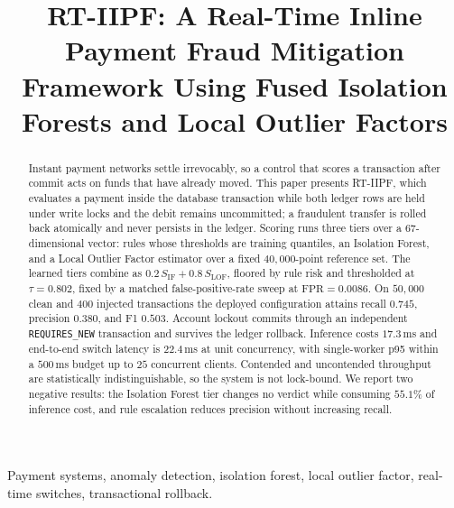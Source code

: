 \documentclass[conference]{IEEEtran}
\begin{document}
\title{RT-IIPF: A Real-Time Inline Payment Fraud Mitigation
Framework Using Fused Isolation Forests and Local Outlier Factors}

\author{
}

\maketitle

\begin{abstract}
Instant payment networks settle irrevocably, so a control that scores a
transaction after commit acts on funds that have already moved. This
paper presents RT-IIPF, which evaluates a payment inside the database
transaction while both ledger rows are held under write locks and the
debit remains uncommitted; a fraudulent transfer is rolled back
atomically and never persists in the ledger. Scoring runs three tiers
over a $67$-dimensional vector: rules whose thresholds are training
quantiles, an Isolation Forest, and a Local Outlier Factor estimator
over a fixed $40{,}000$-point reference set. The learned tiers combine
as $0.2\,S_{\mathrm{IF}} + 0.8\,S_{\mathrm{LOF}}$, floored by rule risk
and thresholded at $\tau = 0.802$, fixed by a matched
false-positive-rate sweep at $\mathrm{FPR}=0.0086$. On $50{,}000$ clean
and $400$ injected transactions the deployed configuration attains
recall $0.745$, precision $0.380$, and F1 $0.503$. Account lockout
commits through an independent \texttt{REQUIRES\_NEW} transaction and
survives the ledger rollback. Inference costs $17.3$\,ms and end-to-end
switch latency is $22.4$\,ms at unit concurrency, with single-worker p95
within a $500$\,ms budget up to $25$ concurrent clients. Contended and
uncontended throughput are statistically indistinguishable, so the
system is not lock-bound. We report two negative results: the Isolation
Forest tier changes no verdict while consuming $55.1\%$ of inference
cost, and rule escalation reduces precision without increasing recall.
\end{abstract}

\begin{IEEEkeywords}
Payment systems, anomaly detection, isolation forest, local outlier
factor, real-time switches, transactional rollback.
\end{IEEEkeywords}
\end{document}
